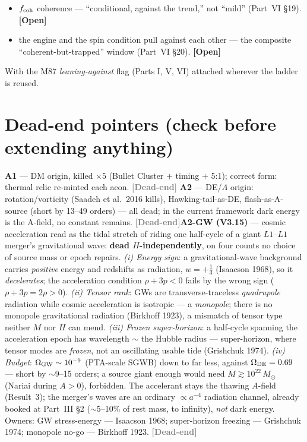 \documentclass[11pt]{article}
\newcommand{\open}{\textcolor{red!70!black}{\textbf{[Open]}}}
\newcommand{\dead}{\textcolor{gray}{\textbf{[Dead-end]}}}
\newcommand{\msun}{M_\odot}
\begin{document}
\begin{itemize}[leftmargin=2.9em,itemsep=2pt]
\item[\textbf{(J3)}] $f_{\rm coh}$ coherence --- ``conditional, against the trend,'' not ``mild'' (Part~VI \S19). \open
\item[\textbf{(J4)}] the engine and the spin condition pull against each other --- the composite ``coherent-but-trapped'' window (Part~VI \S20). \open
\end{itemize}
With the M87 \emph{leaning-against} flag (Parts I, V, VI) attached wherever the ladder is reused.

\section{Dead-end pointers (check before extending anything)}
\textbf{A1} --- DM origin, killed $\times5$ (Bullet Cluster $+$ timing $+$ 5:1); correct form: thermal relic re-minted each aeon. \dead\quad
\textbf{A2} --- DE/$\Lambda$ origin: rotation/vorticity (Saadeh et al.\ 2016 kills), Hawking-tail-as-DE, flash-as-A-source (short by 13--49 orders) --- all dead; in the current framework dark energy is the A-field, no constant remains. \dead\quad \textbf{A2-GW (V3.15)} --- cosmic acceleration read as the tidal stretch of riding one half-cycle of a giant $L1$--$L1$ merger's gravitational wave: \textbf{dead $H$-independently}, on four counts no choice of source mass or epoch repairs. \emph{(i) Energy sign}: a gravitational-wave background carries \emph{positive} energy and redshifts as radiation, $w=+\tfrac13$ (Isaacson 1968), so it \emph{decelerates}; the acceleration condition $\rho+3p<0$ fails by the wrong sign ($\rho+3p=2\rho>0$). \emph{(ii) Tensor rank}: GWs are transverse-traceless \emph{quadrupole} radiation while cosmic acceleration is isotropic --- a \emph{monopole}; there is no monopole gravitational radiation (Birkhoff 1923), a mismatch of tensor type neither $M$ nor $H$ can mend. \emph{(iii) Frozen super-horizon}: a half-cycle spanning the acceleration epoch has wavelength $\sim$ the Hubble radius --- super-horizon, where tensor modes are \emph{frozen}, not an oscillating usable tide (Grishchuk 1974). \emph{(iv) Budget}: $\Omega_{\rm GW}\sim10^{-9}$ (PTA-scale SGWB) down to far less, against $\Omega_{\rm DE}=0.69$ --- short by $\sim$9--15 orders; a source giant enough would need $M\gtrsim10^{22}\,\msun$ (Nariai during $A>0$), forbidden. The accelerant stays the thawing $A$-field (Result~3); the merger's waves are an ordinary $\propto a^{-4}$ radiation channel, already booked at Part~III \S2 ($\sim$5--10\% of rest mass, to infinity), \emph{not} dark energy. Owners: GW stress-energy --- Isaacson 1968; super-horizon freezing --- Grishchuk 1974; monopole no-go --- Birkhoff 1923. \dead\quad
\end{document}
